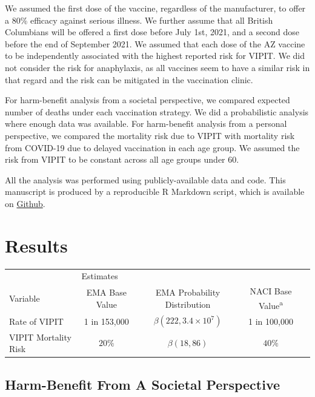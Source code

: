 \documentclass[]{interact}
\theoremstyle{plain}%
\theoremstyle{definition}
\theoremstyle{remark}
\begin{document}
We assumed the first dose of the vaccine, regardless of the
manufacturer, to offer a 80\% efficacy against serious illness. We
further assume that all British Columbians will be offered a first dose
before July 1st, 2021, and a second dose before the end of September
2021. We assumed that each dose of the AZ vaccine to be independently
associated with the highest reported risk for VIPIT. We did not consider
the risk for anaphylaxis, as all vaccines seem to have a similar risk in
that regard and the risk can be mitigated in the vaccination clinic.

For harm-benefit analysis from a societal perspective, we compared
expected number of deaths under each vaccination strategy. We did a
probabilistic analysis where enough data was available. For harm-benefit
analysis from a personal perspective, we compared the mortality risk due
to VIPIT with mortality risk from COVID-19 due to delayed vaccination in
each age group. We assumed the risk from VIPIT to be constant across all
age groups under 60.

All the analysis was performed using publicly-available data and code.
This manuscript is produced by a reproducible R Markdown script, which
is available on
\href{https://github.com/aminadibi/astrazenecaVIPIT}{Github}.

\hypertarget{results}{%
\section{Results}\label{results}}

\begin{table}
{\begin{tabular}{lcccc} \toprule
 & \multicolumn{2}{l}{Estimates} \\ \cmidrule{2-4}
 Variable & EMA Base Value & EMA Probability Distribution & NACI Base Value\textsuperscript{a}  \\ \midrule
 Rate of VIPIT & 1 in 153,000 & $\beta(222, 3.4\times 10^7)$ & 1 in 100,000 \\
 VIPIT Mortality Risk & $20\%$ &  $\beta(18, 86)$ & $40\%$ \\ \bottomrule
\end{tabular}}
\label{sample-table}
\end{table}

\hypertarget{harm-benefit-from-a-societal-perspective}{%
\subsection{Harm-Benefit From A Societal
Perspective}\label{harm-benefit-from-a-societal-perspective}}
\end{document}
